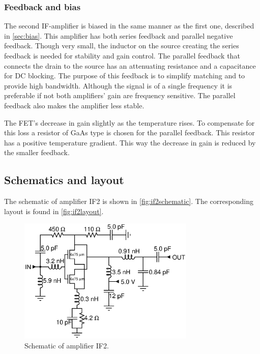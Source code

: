 			\subsubsection{Feedback and bias}
				The second IF-amplifier is biased in the same manner as the first one, described in \autoref{sec:bias}. This amplifier has both series feedback and parallel negative feedback. Though very small, the inductor on the source creating the series feedback is needed for stability and gain control. The parallel feedback that connects the drain to the source has an attenuating resistance and a capacitance for DC blocking. The purpose of this feedback is to simplify matching and to provide high bandwidth. Although the signal is of a single frequency it is preferable if not both amplifiers' gain are frequency sensitive. The parallel feedback also makes the amplifier less stable.

				The FET's decrease in gain slightly as the temperature rises. To compensate for this loss a resistor of GaAs type is chosen for the parallel feedback. This resistor has a positive temperature gradient. This way the decrease in gain is reduced by the smaller feedback.

		\subsection{Schematics and layout}
			The schematic of amplifier IF2 is shown in \autoref{fig:if2schematic}. The corresponding layout is found in \autoref{fig:if2layout}.

			\begin{figure}[hbt!]
				\centering
				\includegraphics[width=0.75\textwidth]{fig/amplifiers/if2/sch_if2}
				\caption[Amplifier IF2 schematic.]{Schematic of amplifier IF2.}\label{fig:if2schematic}
			\end{figure}

